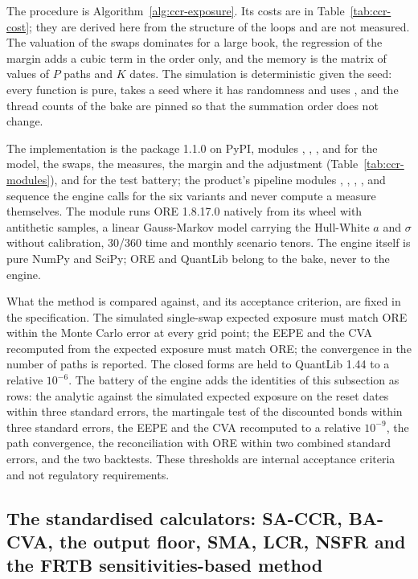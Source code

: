 The procedure is Algorithm~\ref{alg:ccr-exposure}. Its costs are in Table~\ref{tab:ccr-cost}; they are derived here from the structure of the loops and are not measured. The valuation of the swaps dominates for a large book, the regression of the margin adds a cubic term in the order only, and the memory is the matrix of values of $P$ paths and $K$ dates. The simulation is deterministic given the seed:
every function is pure, takes a seed where it has randomness and uses , and the thread counts of the bake are pinned so that the summation order does not change.

The implementation is the package  1.1.0 on PyPI, modules , , ,  and  for the model, the swaps, the measures, the margin and the adjustment (Table~\ref{tab:ccr-modules}), and  for the test battery; the product's pipeline modules , ,
, ,  and  sequence the engine calls for the six variants and never compute a measure themselves. The module  runs ORE 1.8.17.0 natively from its wheel with \ccrOreSamples{} antithetic samples, a linear Gauss-Markov model carrying the Hull-White $a$ and $\sigma$ without calibration, 30/360 time and monthly scenario tenors.
The engine itself is pure NumPy and SciPy; ORE and QuantLib belong to the bake, never to the engine.

What the method is compared against, and its acceptance criterion, are fixed in the specification. The simulated single-swap expected exposure must match ORE within the Monte Carlo error at every grid point; the EEPE and the CVA recomputed from the expected exposure must match ORE; the convergence in the number of paths is reported. The closed forms are held to QuantLib 1.44 to a relative $10^{-6}$. The battery of the engine adds the identities of this subsection as rows: the analytic against the simulated expected exposure
on the reset dates within three standard errors, the martingale test of the discounted bonds within three standard errors, the EEPE and the CVA recomputed to a relative $10^{-9}$, the path convergence, the reconciliation with ORE within two combined standard errors, and the two backtests. These thresholds are internal acceptance criteria and not regulatory requirements.

\subsection{The standardised calculators: SA-CCR, BA-CVA, the output floor, SMA, LCR, NSFR and the FRTB sensitivities-based method}
\label{sec:m21}

